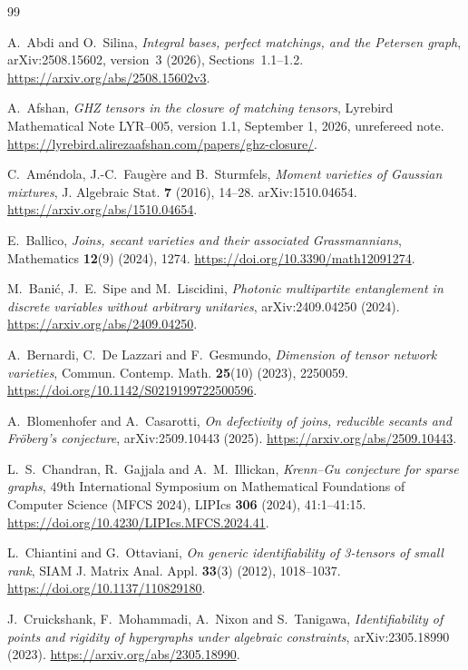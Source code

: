 \documentclass[11pt]{article}
\theoremstyle{remark}\newtheorem{remark}[theorem]{Remark}
\begin{document}
\begin{thebibliography}{99}
\raggedright
{}
A.~Abdi and O.~Silina,
\emph{Integral bases, perfect matchings, and the Petersen graph},
arXiv:2508.15602, version~3 (2026),
Sections~1.1--1.2.
\url{https://arxiv.org/abs/2508.15602v3}.

A.~Afshan,
\emph{GHZ tensors in the closure of matching tensors},
Lyrebird Mathematical Note LYR--005, version 1.1, September 1, 2026,
unrefereed note.
\url{https://lyrebird.alirezaafshan.com/papers/ghz-closure/}.

C.~Am\'endola, J.-C.~Faug\`ere and B.~Sturmfels,
\emph{Moment varieties of Gaussian mixtures},
J. Algebraic Stat. \textbf{7} (2016), 14--28.
arXiv:1510.04654.
\url{https://arxiv.org/abs/1510.04654}.

E.~Ballico,
\emph{Joins, secant varieties and their associated Grassmannians},
Mathematics \textbf{12}(9) (2024), 1274.
\url{https://doi.org/10.3390/math12091274}.

M.~Bani\'c, J.~E.~Sipe and M.~Liscidini,
\emph{Photonic multipartite entanglement in discrete variables without arbitrary unitaries},
arXiv:2409.04250 (2024).
\url{https://arxiv.org/abs/2409.04250}.

A.~Bernardi, C.~De Lazzari and F.~Gesmundo,
\emph{Dimension of tensor network varieties},
Commun. Contemp. Math. \textbf{25}(10) (2023), 2250059.
\url{https://doi.org/10.1142/S0219199722500596}.

A.~Blomenhofer and A.~Casarotti,
\emph{On defectivity of joins, reducible secants and Fr\"oberg's conjecture},
arXiv:2509.10443 (2025).
\url{https://arxiv.org/abs/2509.10443}.

L.~S.~Chandran, R.~Gajjala and A.~M.~Illickan,
\emph{Krenn--Gu conjecture for sparse graphs},
49th International Symposium on Mathematical Foundations of Computer Science (MFCS 2024),
LIPIcs \textbf{306} (2024), 41:1--41:15.
\url{https://doi.org/10.4230/LIPIcs.MFCS.2024.41}.

L.~Chiantini and G.~Ottaviani,
\emph{On generic identifiability of 3-tensors of small rank},
SIAM J. Matrix Anal. Appl. \textbf{33}(3) (2012), 1018--1037.
\url{https://doi.org/10.1137/110829180}.

J.~Cruickshank, F.~Mohammadi, A.~Nixon and S.~Tanigawa,
\emph{Identifiability of points and rigidity of hypergraphs under algebraic constraints},
arXiv:2305.18990 (2023).
\url{https://arxiv.org/abs/2305.18990}.


\end{thebibliography}
\end{document}
